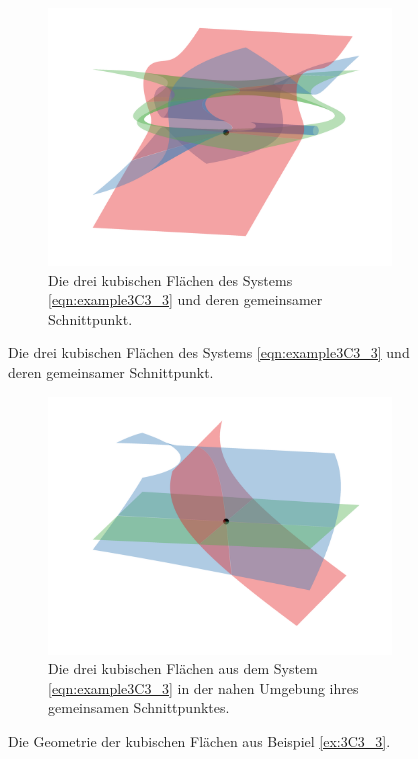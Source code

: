 \documentclass[a4paper,oneside, 11pt, openany%
]{article}
\theoremstyle{custom}
\theoremstyle{custom}
\begin{document}
\begin{figure}[H]
	\begin{subfigure}[b]{0.8\textwidth}
	\includegraphics[width=\textwidth]{"images/e3c3_example3.png"}
	\caption{Die drei kubischen Flächen des Systems \eqref{eqn:example3C3_3} und deren gemeinsamer Schnittpunkt.}
\end{subfigure}
\end{figure}
\begin{figure}[H]\ContinuedFloat
	\begin{subfigure}[b]{0.8\textwidth}
	\includegraphics[width=\textwidth]{"images/e3c3_example3_zoom.png"}
	\caption{Die drei kubischen Flächen aus dem System \eqref{eqn:example3C3_3} in der nahen Umgebung ihres gemeinsamen Schnittpunktes.}
\end{subfigure}
\caption{Die Geometrie der kubischen Flächen aus Beispiel \ref{ex:3C3_3}.}
\end{figure}
\end{document}
